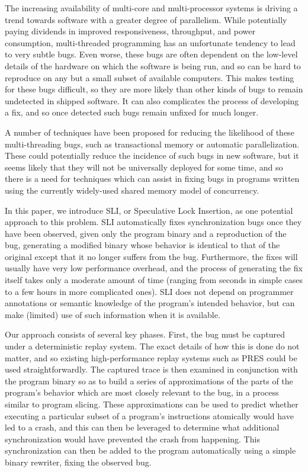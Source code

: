\documentclass[10pt,twocolumn,preprint,natbib,authoryear]{sigplanconf}
\begin{document}
The increasing availability of multi-core and multi-processor systems
is driving a trend towards software with a greater degree of
parallelism.  While potentially paying dividends in improved
responsiveness, throughput, and power consumption, multi-threaded
programming has an unfortunate tendency to lead to very subtle bugs.
Even worse, these bugs are often dependent on the low-level details of
the hardware on which the software is being run, and so can be hard to
reproduce on any but a small subset of available computers.  This
makes testing for these bugs difficult, so they are more likely than
other kinds of bugs to remain undetected in shipped software.  It can
also complicates the process of developing a fix, and so once detected
such bugs remain unfixed for much longer.

A number of techniques have been proposed for reducing the likelihood
of these multi-threading bugs, such as transactional
memory\cite{Shavit1997} or automatic parallelization\cite{Bacon1994}.
These could potentially reduce the incidence of such bugs in new
software, but it seems likely that they will not be universally
deployed for some time, and so there is a need for techniques which
can assist in fixing bugs in programs written using the currently
widely-used shared memory model of concurrency.

In this paper, we introduce SLI, or Speculative Lock Insertion, as one
potential approach to this problem.  SLI automatically fixes
synchronization bugs once they have been observed, given only the
program binary and a reproduction of the bug, generating a modified
binary whose behavior is identical to that of the original except that
it no longer suffers from the bug.  Furthermore, the fixes will
usually have very low performance overhead, and the process of
generating the fix itself takes only a moderate amount of time
(ranging from seconds in simple cases to a few hours in more
complicated ones).  SLI does not depend on programmer annotations or
semantic knowledge of the program's intended behavior, but can make
(limited) use of such information when it is available.

Our approach consists of several key phases.  First, the bug must be
captured under a deterministic replay system.  The exact details of
how this is done do not matter, and so existing high-performance
replay systems such as PRES\cite{Park2009} could be used
straightforwardly.  The captured trace is then examined in conjunction
with the program binary so as to build a series of approximations of
the parts of the program's behavior which are most closely relevant to
the bug, in a process similar to program slicing\cite{Weiser1979}.
These approximations can be used to predict whether executing a
particular subset of a program's instructions atomically would have
led to a crash, and this can then be leveraged to determine what
additional synchronization would have prevented the crash from
happening.  This synchronization can then be added to the program
automatically using a simple binary rewriter, fixing the observed bug.
\end{document}
